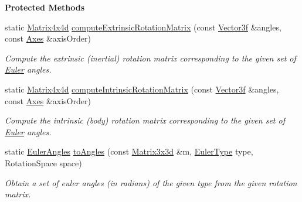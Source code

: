 \begin{Indent}\textbf{ Protected Methods}\par
\begin{DoxyCompactItemize}
\item 
\mbox{\label{classrev_1_1_euler_angles_ad8decdd16a35de467f969243af197310}} 
static \mbox{\hyperlink{classrev_1_1_square_matrix}{Matrix4x4d}} \mbox{\hyperlink{classrev_1_1_euler_angles_ad8decdd16a35de467f969243af197310}{compute\+Extrinsic\+Rotation\+Matrix}} (const \mbox{\hyperlink{classrev_1_1_vector}{Vector3f}} \&angles, const \mbox{\hyperlink{classrev_1_1_vector}{Axes}} \&axis\+Order)
\begin{DoxyCompactList}\small\item\em Compute the extrinsic (inertial) rotation matrix corresponding to the given set of \mbox{\hyperlink{class_euler}{Euler}} angles. \end{DoxyCompactList}\item 
\mbox{\label{classrev_1_1_euler_angles_a6a41b97fa7e80f78a92ee5451efbc659}} 
static \mbox{\hyperlink{classrev_1_1_square_matrix}{Matrix4x4d}} \mbox{\hyperlink{classrev_1_1_euler_angles_a6a41b97fa7e80f78a92ee5451efbc659}{compute\+Intrinsic\+Rotation\+Matrix}} (const \mbox{\hyperlink{classrev_1_1_vector}{Vector3f}} \&angles, const \mbox{\hyperlink{classrev_1_1_vector}{Axes}} \&axis\+Order)
\begin{DoxyCompactList}\small\item\em Compute the intrinsic (body) rotation matrix corresponding to the given set of \mbox{\hyperlink{class_euler}{Euler}} angles. \end{DoxyCompactList}\item 
\mbox{\label{classrev_1_1_euler_angles_aaf9db8edc0cef335d0dd06aff34e4009}} 
static \mbox{\hyperlink{classrev_1_1_euler_angles}{Euler\+Angles}} \mbox{\hyperlink{classrev_1_1_euler_angles_aaf9db8edc0cef335d0dd06aff34e4009}{to\+Angles}} (const \mbox{\hyperlink{classrev_1_1_square_matrix}{Matrix3x3d}} \&m, \mbox{\hyperlink{classrev_1_1_euler_angles_a27302602f4b1e12892749e201df3d52d}{Euler\+Type}} type, Rotation\+Space space)
\begin{DoxyCompactList}\small\item\em Obtain a set of euler angles (in radians) of the given type from the given rotation matrix. \end{DoxyCompactList}\end{DoxyCompactItemize}
\end{Indent}
